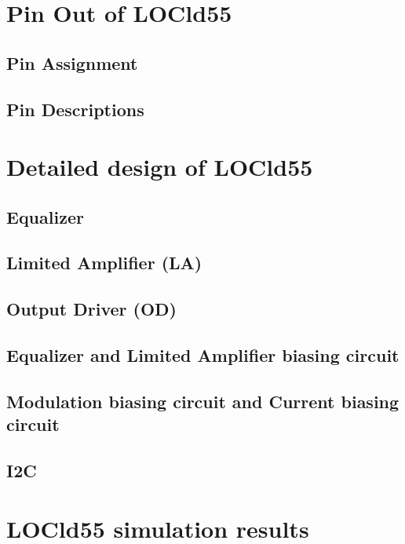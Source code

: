 \documentclass[15pt,a4paper]{article}
\begin{document}
\begin{spacing}{1.25}
\section{Pin Out of LOCld55}                %

\subsection{Pin Assignment}

\subsection{Pin Descriptions}

\section{Detailed design of LOCld55}        %
\subsection{Equalizer}

\subsection{Limited Amplifier (LA)}

\subsection{Output Driver (OD)}

\subsection{Equalizer and Limited Amplifier biasing circuit}

\subsection{Modulation biasing circuit and Current biasing circuit}

\subsection{I2C}

\section{LOCld55 simulation results}        %


\end{spacing}
\end{document}
